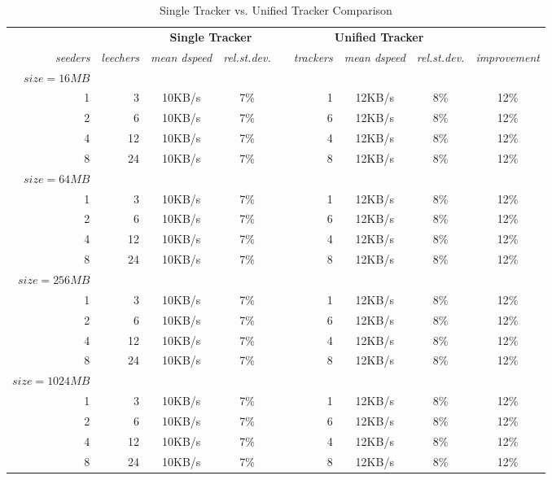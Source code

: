 \documentclass[a4paper,final,12pt]{article}
\begin{document}
\begin{sidewaystable}
  \centering
  \begin{tabular}{@{}rrcccrccc@{}}
    \toprule
       & & \multicolumn{2}{c}{\textbf{Single Tracker}} & &
       \multicolumn{3}{c}{\textbf{Unified
       Tracker}} & \\
    \cmidrule{3-4} \cmidrule{6-8}
      \textit{seeders} & \textit{leechers} & \textit{mean dspeed} &
      \textit{rel.st.dev.} & & \textit{trackers} & \textit{mean dspeed} &
      \textit{rel.st.dev.} & \textit{improvement} \\
    \midrule
      $size = 16MB$\\
      1 & 3 & 10KB/s & 7\% & & 1 & 12KB/s & 8\% & 12\% \\
      2 & 6 & 10KB/s & 7\% & & 6 & 12KB/s & 8\% & 12\% \\
      4 & 12 & 10KB/s & 7\% & & 4 & 12KB/s & 8\% & 12\% \\
      8 & 24 & 10KB/s & 7\% & & 8 & 12KB/s & 8\% & 12\% \\
      $size = 64MB$\\
      1 & 3 & 10KB/s & 7\% & & 1 & 12KB/s & 8\% & 12\% \\
      2 & 6 & 10KB/s & 7\% & & 6 & 12KB/s & 8\% & 12\% \\
      4 & 12 & 10KB/s & 7\% & & 4 & 12KB/s & 8\% & 12\% \\
      8 & 24 & 10KB/s & 7\% & & 8 & 12KB/s & 8\% & 12\% \\
      $size = 256MB$\\
      1 & 3 & 10KB/s & 7\% & & 1 & 12KB/s & 8\% & 12\% \\
      2 & 6 & 10KB/s & 7\% & & 6 & 12KB/s & 8\% & 12\% \\
      4 & 12 & 10KB/s & 7\% & & 4 & 12KB/s & 8\% & 12\% \\
      8 & 24 & 10KB/s & 7\% & & 8 & 12KB/s & 8\% & 12\% \\
      $size = 1024MB$\\
      1 & 3 & 10KB/s & 7\% & & 1 & 12KB/s & 8\% & 12\% \\
      2 & 6 & 10KB/s & 7\% & & 6 & 12KB/s & 8\% & 12\% \\
      4 & 12 & 10KB/s & 7\% & & 4 & 12KB/s & 8\% & 12\% \\
      8 & 24 & 10KB/s & 7\% & & 8 & 12KB/s & 8\% & 12\% \\
    \bottomrule
  \end{tabular}
  \caption{Single Tracker vs. Unified Tracker Comparison}
\end{sidewaystable}
\end{document}

